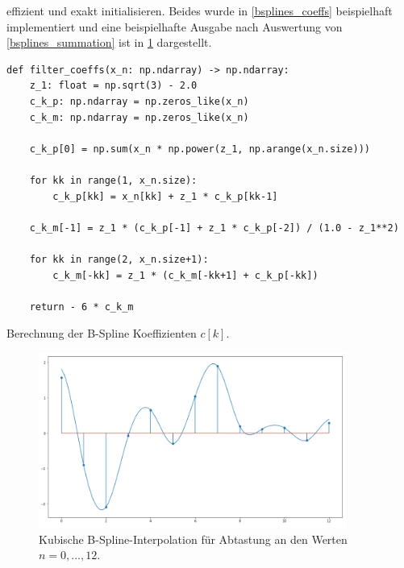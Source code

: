 effizient und exakt initialisieren. Beides wurde in \cref{bsplines_coeffs} beispielhaft implementiert und eine beispielhafte Ausgabe nach Auswertung von \eqref{bsplines_summation} ist in \cref{bsplines_interpol_pic} dargestellt.
%
\begin{listing}[t]
\begin{verbatim}
def filter_coeffs(x_n: np.ndarray) -> np.ndarray:
    z_1: float = np.sqrt(3) - 2.0
    c_k_p: np.ndarray = np.zeros_like(x_n)
    c_k_m: np.ndarray = np.zeros_like(x_n)
    
    c_k_p[0] = np.sum(x_n * np.power(z_1, np.arange(x_n.size)))
    
    for kk in range(1, x_n.size):
        c_k_p[kk] = x_n[kk] + z_1 * c_k_p[kk-1]
    
    c_k_m[-1] = z_1 * (c_k_p[-1] + z_1 * c_k_p[-2]) / (1.0 - z_1**2)

    for kk in range(2, x_n.size+1):
        c_k_m[-kk] = z_1 * (c_k_m[-kk+1] + c_k_p[-kk])
        
    return - 6 * c_k_m
\end{verbatim}
\caption{Berechnung der B-Spline Koeffizienten $c[k]$.}\label{bsplines_coeffs}            
\end{listing}
%
\begin{figure}[t]
    \centering\includegraphics[width=0.9\textwidth]{img/bsplines/interpol.png}
    \caption{Kubische B-Spline-Interpolation f\"ur Abtastung an den Werten $n = 0, \dots, 12$.}\label{bsplines_interpol_pic}
\end{figure}
%
%
%
